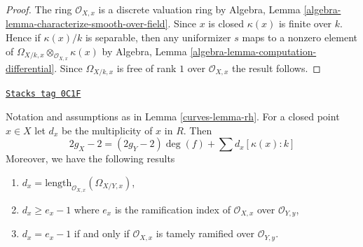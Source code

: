 \begin{proof}
The ring $\mathcal{O}_{X, x}$ is a discrete valuation ring by
Algebra, Lemma \ref{algebra-lemma-characterize-smooth-over-field}.
Since $x$ is closed $\kappa(x)$ is finite over $k$. Hence if
$\kappa(x)/k$ is separable, then any uniformizer $s$
maps to a nonzero element of
$\Omega_{X/k, x} \otimes_{\mathcal{O}_{X, x}} \kappa(x)$ by
Algebra, Lemma \ref{algebra-lemma-computation-differential}.
Since $\Omega_{X/k, x}$ is free of rank $1$ over $\mathcal{O}_{X, x}$
the result follows.
\end{proof}

\begin{lemma}[Rhe]
\label{curves-lemma-rhe}
\href{https://stacks.math.columbia.edu/tag/0C1F}{\texttt{Stacks tag 0C1F}}

Notation and assumptions as in Lemma \ref{curves-lemma-rh}. For a closed point
$x \in X$ let $d_x$ be the multiplicity of $x$ in $R$. Then
$$
2g_X - 2 = (2g_Y - 2) \deg(f) + \sum\nolimits d_x [\kappa(x) : k]
$$
Moreover, we have the following results
\begin{enumerate}
\item $d_x = \text{length}_{\mathcal{O}_{X, x}}(\Omega_{X/Y, x})$,
\item $d_x \geq e_x - 1$ where $e_x$ is the ramification index
of $\mathcal{O}_{X, x}$ over $\mathcal{O}_{Y, y}$,
\item $d_x = e_x - 1$ if and only if $\mathcal{O}_{X, x}$ is tamely
ramified over $\mathcal{O}_{Y, y}$.
\end{enumerate}
\end{lemma}

